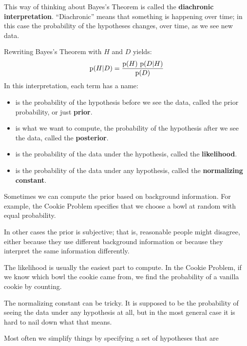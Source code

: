 \documentclass[12pt]{book}
\begin{document}
This way of thinking about Bayes's Theorem is called the
{\bf diachronic interpretation}.  ``Diachronic'' means that something
is happening over time; in this case
the probability of the hypotheses changes, over time, as
we see new data.

Rewriting Bayes's Theorem with $H$ and $D$ yields:
%
\[ \mathrm{p}(H|D) = \frac{\mathrm{p}(H)~\mathrm{p}(D|H)}{\mathrm{p}(D)} \]
%
In this interpretation, each term has a name:

\begin{itemize}

\item {} is the probability of the hypothesis before we see
the data, called the prior probability, or just {\bf prior}.

\item {} is what we want to compute, the probability of
the hypothesis after we see the data, called the {\bf posterior}.
 
\item {} is the probability of the data under the hypothesis,
called the {\bf likelihood}.

\item {} is the probability of the data under any hypothesis,
called the {\bf normalizing constant}.

\end{itemize}

Sometimes we can compute the prior based on background
information.  For example, the Cookie Problem specifies that we choose
a bowl at random with equal probability.

In other cases the prior is subjective; that is, reasonable people
might disagree, either because they use different background
information or because they interpret the same information
differently.

The likelihood is usually the easiest part to compute.  In the
Cookie Problem, if we know which bowl the cookie came from,
we find the probability of a vanilla cookie by counting.

The normalizing constant can be tricky.  It is supposed to be the
probability of seeing the data under any hypothesis at all, but in the
most general case it is hard to nail down what that means.

Most often we simplify things by specifying a set of hypotheses
that are
\end{document}
